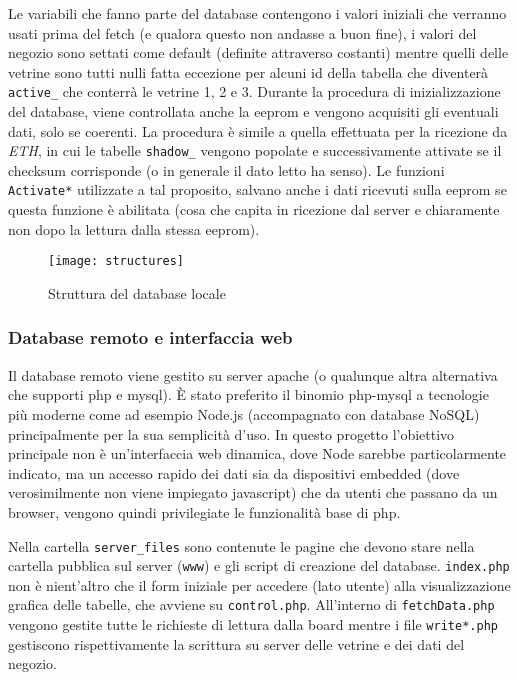 Le variabili che fanno parte del database contengono i valori iniziali che verranno usati prima del fetch (e qualora questo non andasse a buon fine), i valori del negozio sono settati come default (definite attraverso costanti) mentre quelli delle vetrine sono tutti nulli fatta eccezione per alcuni id della tabella che diventer\`a \texttt{active\_} che conterr\`a le vetrine 1, 2 e 3. Durante la procedura di inizializzazione del database, viene controllata anche la eeprom e vengono acquisiti gli eventuali dati, solo se coerenti. La procedura \`e simile a quella effettuata per la ricezione da \textit{ETH}, in cui le tabelle \texttt{shadow\_} vengono popolate e successivamente attivate se il checksum corrisponde (o in generale il dato letto ha senso). Le funzioni \texttt{Activate*} utilizzate a tal proposito, salvano anche i dati ricevuti sulla eeprom se questa funzione \`e abilitata (cosa che capita in ricezione dal server e chiaramente non dopo la lettura dalla stessa eeprom).

\begin{figure}[ht]
	\texttt{[image: structures]}
  \caption{Struttura del database locale}
\end{figure}

\subsubsection{Database remoto e interfaccia web}

Il database remoto viene gestito su server apache (o qualunque altra alternativa che supporti php e mysql). \`E stato preferito il binomio php-mysql a tecnologie pi\`u moderne come ad esempio Node.js (accompagnato con database NoSQL) principalmente per la sua semplicit\`a d'uso. In questo progetto l'obiettivo principale non \`e un'interfaccia web dinamica, dove Node sarebbe particolarmente indicato, ma un accesso rapido dei dati sia da dispositivi embedded (dove verosimilmente non viene impiegato javascript) che da utenti che passano da un browser, vengono quindi privilegiate le funzionalit\`a base di php.

Nella cartella \texttt{server\_files} sono contenute le pagine che devono stare nella cartella pubblica sul server (\texttt{www}) e gli script di creazione del database. \texttt{index.php} non \`e nient'altro che il form iniziale per accedere (lato utente) alla visualizzazione grafica delle tabelle, che avviene su \texttt{control.php}. All'interno di \texttt{fetchData.php} vengono gestite tutte le richieste di lettura dalla board mentre i file \texttt{write*.php} gestiscono rispettivamente la scrittura su server delle vetrine e dei dati del negozio.

